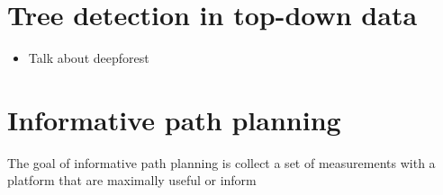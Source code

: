 \section{Tree detection in top-down data}
\begin{itemize}
    \item Talk about deepforest
\end{itemize}

\section{Informative path planning}



The goal of informative path planning is collect a set of measurements with a platform that are maximally useful or inform


